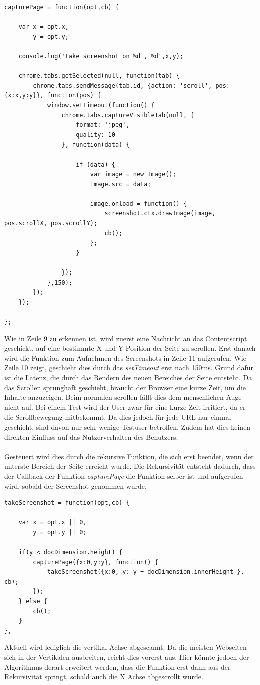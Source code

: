 \begin{lstlisting}[caption=Funktion zum Abscannen des aktuell sichtbaren Bereiches der Seite,label=captureVisibleTab]
capturePage = function(opt,cb) {

    var x = opt.x,
        y = opt.y;

    console.log('take screenshot on %d , %d',x,y);

    chrome.tabs.getSelected(null, function(tab) {
        chrome.tabs.sendMessage(tab.id, {action: 'scroll', pos: {x:x,y:y}}, function(pos) {
            window.setTimeout(function() {
                chrome.tabs.captureVisibleTab(null, {
                    format: 'jpeg',
                    quality: 10
                }, function(data) {

                    if (data) {
                        var image = new Image();
                        image.src = data;

                        image.onload = function() {
                            screenshot.ctx.drawImage(image, pos.scrollX, pos.scrollY);
                            cb();
                        };
                    }

                });
            },150);
        });
    });

};
\end{lstlisting}

Wie in Zeile 9 zu erkennen ist, wird zuerst eine Nachricht an das Contentscript geschickt, auf eine bestimmte X und Y Position der Seite zu scrollen. Erst danach wird die Funktion zum Aufnehmen des Screenshots in Zeile 11 aufgerufen. Wie Zeile 10 zeigt, geschieht dies durch das \textit{setTimeout} erst nach 150ms. Grund dafür ist die Latenz, die durch das Rendern des neuen Bereiches der Seite entsteht. Da das Scrollen sprunghaft geschieht, braucht der Browser eine kurze Zeit, um die Inhalte anzuzeigen. Beim normalen scrollen fällt dies dem menschlichen Auge nicht auf. Bei einem Test wird der User zwar für eine kurze Zeit irritiert, da er die Scrollbewegung mitbekommt. Da dies jedoch für jede URL nur einmal geschieht, sind davon nur sehr wenige Testuser betroffen. Zudem hat dies keinen direkten Einfluss auf das Nutzerverhalten des Benutzers.\\
\\
Gesteuert wird dies durch die rekursive Funktion, die sich erst beendet, wenn der unterste Bereich der Seite erreicht wurde. Die Rekursivität entsteht dadurch, dass der Callback der Funktion \textit{capturePage} die Funktion selber ist und aufgerufen wird, sobald der Screenshot genommen wurde.
\\
\begin{lstlisting}[caption=Rekursive Funktion die das Abscannen der Seite steuert,label=takeScreenshot]
takeScreenshot = function(opt,cb) {

    var x = opt.x || 0,
        y = opt.y || 0;

    if(y < docDimension.height) {
        capturePage({x:0,y:y}, function() {
            takeScreenshot({x:0, y: y + docDimension.innerHeight }, cb);
        });
    } else {
        cb();
    }
},
\end{lstlisting}
\vspace{0,5cm}

Aktuell wird lediglich die vertikal Achse abgescannt. Da die meisten Webseiten sich in der Vertikalen ausbreiten, reicht dies vorerst aus. Hier könnte jedoch der Algorithmus derart erweitert werden, dass die Funktion erst dann aus der Rekursivität springt, sobald auch die X Achse abgescrollt wurde.